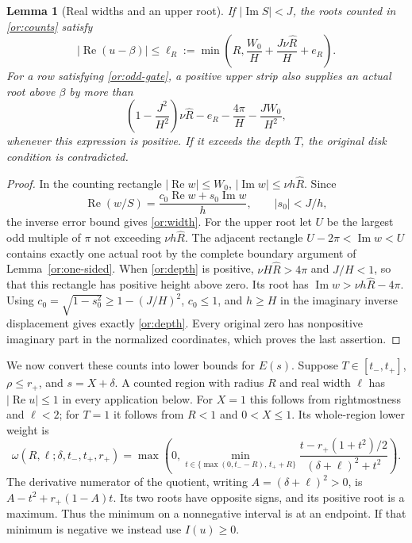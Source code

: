 \documentclass[11pt,reqno]{amsart}
\numberwithin{equation}{section}
\newtheorem{lemma}[theorem]{Lemma}
\theoremstyle{definition}
\theoremstyle{remark}
\renewcommand{\Re}{\operatorname{Re}}
\renewcommand{\Im}{\operatorname{Im}}
\begin{document}
\begin{lemma}[Real widths and an upper root]\label{or:narrow-strip}
If $|\Im S|<J$, the roots counted in \eqref{or:counts} satisfy
\begin{equation}\label{or:width}
 |\Re(u-\beta)|\le\ell_R:=\min\left(R,
         \frac{W_0}{H}+\frac{J\nu\widehat R}{H}+e_R\right).
\end{equation}
For a row satisfying \eqref{or:odd-gate}, a positive upper strip
also supplies an actual root above $\beta$
by more than
\begin{equation}\label{or:depth}
 \left(1-\frac{J^2}{H^2}\right)\nu\widehat R-e_R
       -\frac{4\pi}{H}-\frac{JW_0}{H^2},
\end{equation}
whenever this expression is positive.  If it exceeds the depth $T$,
the original disk condition is contradicted.
\end{lemma}
\begin{proof}
In the counting rectangle $|\Re w|\le W_0$,
$|\Im w|\le\nu h\widehat R$.  Since
\[
 \Re(w/S)=\frac{c_0\Re w+s_0\Im w}{h},\qquad
 |s_0|<J/h,
\]
the inverse error bound gives \eqref{or:width}.
For the upper root let $U$ be the largest odd multiple of $\pi$
not exceeding $\nu h\widehat R$.
The adjacent rectangle $U-2\pi<\Im w<U$ contains exactly one
actual root by the complete boundary argument of
Lemma~\ref{or:one-sided}.  When \eqref{or:depth} is positive,
$\nu H\widehat R>4\pi$ and $J/H<1$, so that this rectangle has
positive height above zero.  Its root has
$\Im w>\nu h\widehat R-4\pi$.
Using $c_0=\sqrt{1-s_0^2}\ge1-(J/H)^2$, $c_0\le1$, and $h\ge H$
in the imaginary inverse displacement gives exactly
\eqref{or:depth}.  Every original zero has nonpositive imaginary
part in the normalized coordinates, which proves the last assertion.
\end{proof}

We now convert these counts into lower bounds for $E(s)$.  Suppose
$T\in[t_-,t_+]$, $\rho\le r_+$, and $s=X+\delta$.  A counted region
with radius $R$ and real width $\ell$ has $|\Re u|\le1$ in every
application below.  For $X=1$ this follows from rightmostness and
$\ell<2$; for $T=1$ it follows from $R<1$ and $0<X\le1$.
Its whole-region lower weight is
\begin{equation}\label{or:weight}
 \omega(R,\ell;\delta,t_-,t_+,r_+)
 =\max\left(0,\min_{t\in\{\max(0,t_--R),\,t_++R\}}
 \frac{t-r_+(1+t^2)/2}{(\delta+\ell)^2+t^2}\right).
\end{equation}
The derivative numerator of the quotient, writing
$A=(\delta+\ell)^2>0$, is
$A-t^2+r_+(1-A)t$.  Its two roots have opposite signs, and its
positive root is a maximum.  Thus the minimum on a nonnegative
interval is at an endpoint.  If that minimum is negative we instead
use $I(u)\ge0$.
\end{document}
